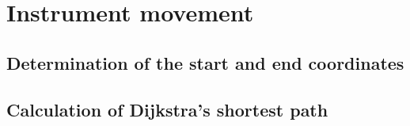 




\section{Instrument movement}
\label{sec:exepath}


\subsection{Determination of the start and end coordinates}



\subsection{Calculation of Dijkstra's shortest path}
\label{sec:dijkstra}


